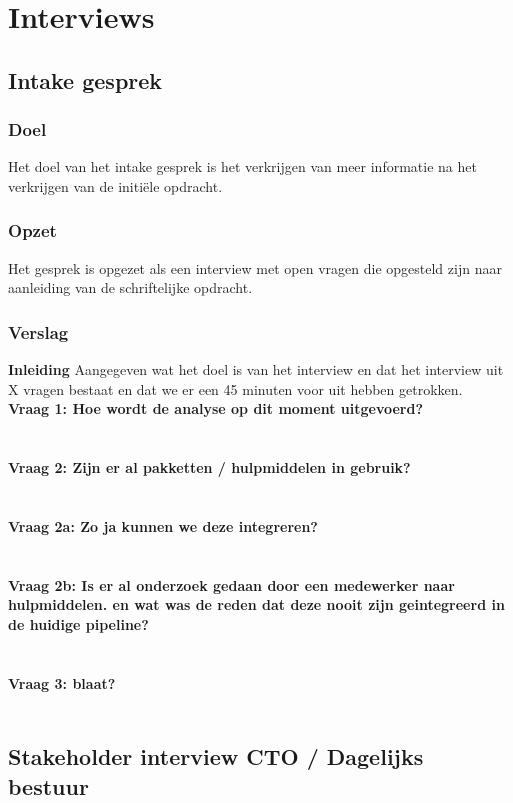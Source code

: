 
\chapter{Interviews}

\section{Intake gesprek}
\subsection{Doel}
Het doel van het intake gesprek is het verkrijgen van meer informatie na het verkrijgen van de initi\"ele opdracht.
\subsection{Opzet}
Het gesprek is opgezet als een interview met open vragen die opgesteld zijn naar aanleiding van de schriftelijke opdracht. 
\subsection{Verslag}
\textbf{Inleiding}
Aangegeven wat het doel is van het interview en dat het interview uit X vragen bestaat en dat we er een 45 minuten voor uit hebben getrokken.\\
\textbf{Vraag 1: Hoe wordt de analyse op dit moment uitgevoerd?}\\
\lipsum[01]\\
\\
\textbf{Vraag 2: Zijn er al pakketten / hulpmiddelen in gebruik?}\\
\lipsum[02]\\
\\
\textbf{Vraag 2a: Zo ja kunnen we deze integreren?}\\
\lipsum[03]\\
\\
\textbf{Vraag 2b: Is er al onderzoek gedaan door een medewerker naar hulpmiddelen. en wat was de reden dat deze nooit zijn geintegreerd in de huidige pipeline?}\\
\lipsum[04]\\
\\
\textbf{Vraag 3: blaat?}\\
\lipsum[05]\\

\section{Stakeholder interview CTO / Dagelijks bestuur}
